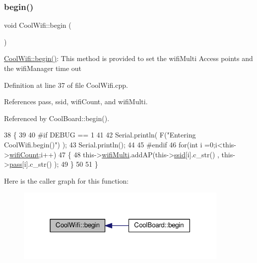 \subsubsection{\texorpdfstring{begin()}{begin()}}
{\footnotesize\ttfamily void Cool\+Wifi\+::begin (\begin{DoxyParamCaption}{ }\end{DoxyParamCaption})}

\hyperlink{classCoolWifi_a46942fed90e475112cc10b78a32e7aaa}{Cool\+Wifi\+::begin()}\+: This method is provided to set the wifi\+Multi Access points and the wifi\+Manager time out 

Definition at line 37 of file Cool\+Wifi.\+cpp.



References pass, ssid, wifi\+Count, and wifi\+Multi.



Referenced by Cool\+Board\+::begin().


\begin{DoxyCode}
38 \{ 
39 
40 \textcolor{preprocessor}{#if DEBUG == 1 }
41 
42     Serial.println( F(\textcolor{stringliteral}{"Entering CoolWifi.begin()"}) );
43     Serial.println();
44 
45 \textcolor{preprocessor}{#endif}
46     \textcolor{keywordflow}{for}(\textcolor{keywordtype}{int} i =0;i<this->\hyperlink{classCoolWifi_ab133bd92fcb895b884deecd6678592e4}{wifiCount};i++)
47     \{
48          this->\hyperlink{classCoolWifi_a7862a8c0d7239877e2956c14a368aab8}{wifiMulti}.addAP(this->\hyperlink{classCoolWifi_a893b21d0fed821438733bba2e73fb4c2}{ssid}[i].c\_str() , this->\hyperlink{classCoolWifi_a0c3332a149245aaad060b32593a54c9b}{pass}[i].c\_str() );    
49     \}
50     
51 \}
\end{DoxyCode}
Here is the caller graph for this function\+:\nopagebreak
\begin{figure}[H]
\begin{center}
\leavevmode
\includegraphics[width=291pt]{classCoolWifi_a46942fed90e475112cc10b78a32e7aaa_icgraph}
\end{center}
\end{figure}
\mbox{\label{classCoolWifi_a4eb2f6b9b09dd588964b88b6c70122c0}} 
